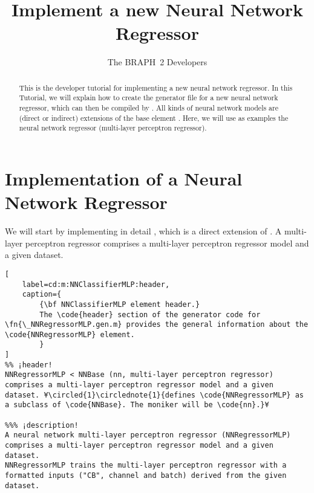 \documentclass{tufte-handout}
\title{Implement a new Neural Network Regressor}
\author[The BRAPH~2 Developers]{The BRAPH~2 Developers}
\begin{document}
\maketitle

\begin{abstract}
\noindent
This is the developer tutorial for implementing a new neural network regressor. 
In this Tutorial, we will explain how to create the generator file  for a new neural network regressor, which can then be compiled by . All kinds of neural network models are (direct or indirect) extensions of the base element . Here, we will use as examples the neural network regressor  (multi-layer perceptron regressor).
\end{abstract}

\tableofcontents

\clearpage
\section{Implementation of a Neural Network Regressor}

We will start by implementing in detail , which is a direct extension of .
A multi-layer perceptron regressor  comprises a multi-layer perceptron regressor model and a given dataset.

\begin{lstlisting}[
	label=cd:m:NNClassifierMLP:header,
	caption={
		{\bf NNClassifierMLP element header.}
		The \code{header} section of the generator code for \fn{\_NNRegressorMLP.gen.m} provides the general information about the \code{NNRegressorMLP} element.
		}
]
%% ¡header!
NNRegressorMLP < NNBase (nn, multi-layer perceptron regressor) comprises a multi-layer perceptron regressor model and a given dataset. ¥\circled{1}\circlednote{1}{defines \code{NNRegressorMLP} as a subclass of \code{NNBase}. The moniker will be \code{nn}.}¥

%%% ¡description!
A neural network multi-layer perceptron regressor (NNRegressorMLP) comprises a multi-layer perceptron regressor model and a given dataset.
NNRegressorMLP trains the multi-layer perceptron regressor with a formatted inputs ("CB", channel and batch) derived from the given dataset.
\end{lstlisting}
\end{document}
